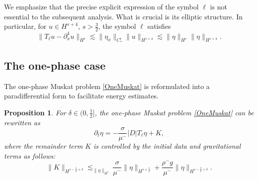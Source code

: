 \documentclass[12pt]{amsart}
\newtheorem{proposition}[theorem]{Proposition}
\theoremstyle{definition}
\numberwithin{equation}{section}
\newcommand{\p}{\partial}
\newcommand{\f}{\frac}
\begin{document}
We emphasize that the precise explicit expression of the symbol $\ell$ is not essential to the subsequent analysis.
What is crucial is its elliptic structure.
In particular, for $u\in H^{s+4}$, $s> \f32$, the symbol $\ell$ satisfies
\begin{equation} \label{ellEst}
    \|T_{\ell} u - \p_x^4 u\|_{H^s} \lesssim \|\eta_x\|_{C^\epsilon_*} \|u \|_{H^{s+4}} \lesssim \|\eta\|_{H^s} \| \eta\|_{H^{s+4}}.
\end{equation}

\subsection{The one-phase case}
The one-phase Muskat problem \eqref{OneMuskat} is reformulated into a paradifferential form to facilitate energy estimates.
\begin{proposition}
For $\delta \in (0, \f12]$, the one-phase Muskat problem \eqref{OneMuskat} can be rewritten as 
\begin{equation} \label{ParaOneMuskat}
 \p_t \eta = -\frac{\sigma}{\mu^{-}} |D|T_\ell \eta + K, 
\end{equation}
where the remainder term $K$ is controlled by the initial data and gravitational terms as follows:
\begin{equation*}
    \|K\|_{H^{s-\f52+\delta}} \lesssim_{\|\eta\|_{H^s}} \frac{\sigma}{\mu^{-}}  \|\eta\|_{H^{s+\f52}} + \frac{\rho^- g}{\mu^-}\| \eta\|_{H^{s-\f32+\delta}}.
\end{equation*}
\end{proposition}
\end{document}
